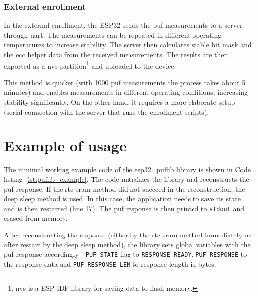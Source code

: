 \subsubsection*{External enrollment}

In the external enrollment, the ESP32 sends the \gls{puf} measurements to a server through \gls{uart}. The measurements can be repeated in different operating temperatures to increase stability. The server then calculates stable bit mask and the \gls{ecc} helper data from the received measurements. The results are then exported as a \gls{nvs} partition\footnote{\gls{nvs} is a ESP-IDF library for saving data to flash memory.} and uploaded to the device.

This method is quicker (with 1000 \gls{puf} measurements the process takes about 5 minutes) and enables measurements in different operating conditions, increasing stability significantly. On the other hand, it requires a more elaborate setup (serial connection with the server that runs the enrollment scripts).

\section{Example of usage}

The minimal working example code of the esp32\_puflib library is shown in Code listing~\ref{lst:puflib_example}. The code initializes the library and reconstructs the \gls{puf} response. If the \gls{rtc} \gls{sram} method did not succeed in the reconstruction, the deep sleep method is used. In this case, the application needs to save its state and is then restarted (line 17). The \gls{puf} response is then printed to \lstinline{stdout} and erased from memory.

After reconstructing the response (either by the \gls{rtc} \gls{sram} method immediately or after restart by the deep sleep method), the library sets global variables with the \gls{puf} response accordingly---\lstinline{PUF_STATE} flag to \lstinline{RESPONSE_READY}, \lstinline{PUF_RESPONSE} to the response data and \lstinline{PUF_RESPONSE_LEN} to response length in bytes.


